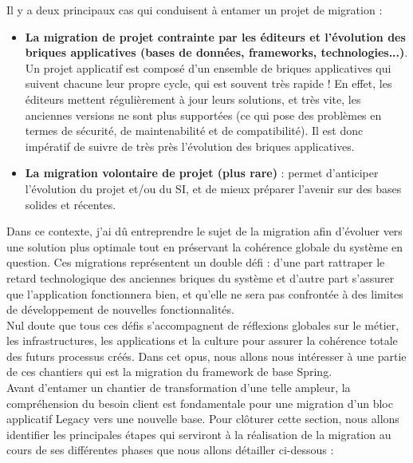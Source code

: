 Il y a deux principaux cas qui conduisent à entamer un projet de migration :
\begin{itemize}
    \item \textbf{La migration de projet contrainte par les éditeurs et l'évolution des briques applicatives (bases de données, frameworks, technologies...)}. Un projet applicatif est composé d'un ensemble de briques applicatives qui suivent chacune leur propre cycle, qui est souvent très rapide ! En effet, les éditeurs mettent régulièrement à jour leurs solutions, et très vite, les anciennes versions ne sont plus supportées (ce qui pose des problèmes en termes de sécurité, de maintenabilité et de compatibilité). Il est donc impératif de suivre de très près l'évolution des briques applicatives.
    \item \textbf{La migration volontaire de projet (plus rare)} : permet d'anticiper l'évolution du projet et/ou du SI, et de mieux préparer l'avenir sur des bases solides et récentes.\\
\end{itemize}

Dans ce contexte, j'ai dû entreprendre le sujet de la migration afin d'évoluer vers une solution plus optimale tout en préservant la cohérence globale du système en question. Ces migrations représentent un double défi : d'une part rattraper le retard technologique des anciennes briques du système et d'autre part s'assurer que l'application fonctionnera bien, et qu'elle ne sera pas confrontée à des limites de développement de nouvelles fonctionnalités.\\

Nul doute que tous ces défis s’accompagnent de réflexions globales sur le métier, les infrastructures, les applications et la culture pour assurer la cohérence totale des futurs processus créés. Dans cet opus, nous allons nous intéresser à une partie de ces chantiers qui est la migration du framework de base Spring.\\

Avant d'entamer un chantier de transformation d’une telle ampleur, la compréhension du besoin client est fondamentale pour une migration d’un bloc applicatif Legacy vers une nouvelle base. Pour clôturer cette section, nous allons identifier les principales étapes qui serviront à la réalisation de la migration au cours de ses différentes phases que nous allons détailler ci-dessous :\\ 

